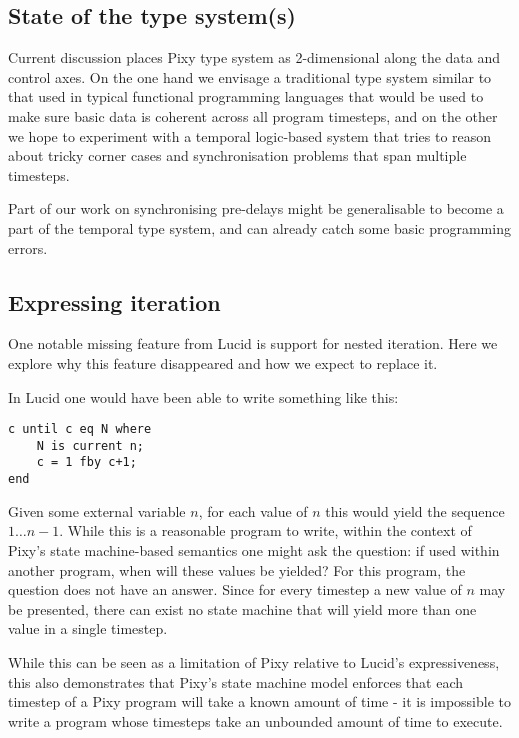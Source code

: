 \documentclass{scrartcl}
\begin{document}
    \subsection{State of the type system(s)}
    
    Current discussion places Pixy type system as 2-dimensional along the data and control axes. On the one hand we envisage a traditional type system similar to that used in typical functional programming languages that would be used to make sure basic data is coherent across all program timesteps, and on the other we hope to experiment with a temporal logic-based system that tries to reason about tricky corner cases and synchronisation problems that span multiple timesteps.
    
    Part of our work on synchronising pre-delays might be generalisable to become a part of the temporal type system, and can already catch some basic programming errors.
    
    \subsection{Expressing iteration}
    
    One notable missing feature from Lucid is support for nested iteration. Here we explore why this feature disappeared and how we expect to replace it.
    
    In Lucid one would have been able to write something like this:
    
    \begin{lstlisting}
c until c eq N where
    N is current n;
    c = 1 fby c+1;
end
    \end{lstlisting}
    
    Given some external variable $n$, for each value of $n$ this would yield the sequence $1 \dots n-1$. While this is a reasonable program to write, within the context of Pixy's state machine-based semantics one might ask the question: if used within another program, when will these values be yielded? For this program, the question does not have an answer. Since for every timestep a new value of $n$ may be presented, there can exist no state machine that will yield more than one value in a single timestep.
    
    While this can be seen as a limitation of Pixy relative to Lucid's expressiveness, this also demonstrates that Pixy's state machine model enforces that each timestep of a Pixy program will take a known amount of time - it is impossible to write a program whose timesteps take an unbounded amount of time to execute.
    
\end{document}
